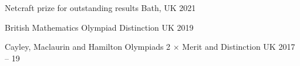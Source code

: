


\begin{cvhonors} 


\cvhonor
{Netcraft prize for outstanding results} %
{} %
{Bath, UK} %
{2021} %

\cvhonor
{British Mathematics Olympiad} %
{Distinction} %
{UK} %
{2019} %


\cvhonor
{Cayley, Maclaurin and Hamilton Olympiads} %
{2 $\times$ Merit and Distinction} %
{UK} %
{2017 -- 19} %


\end{cvhonors}
